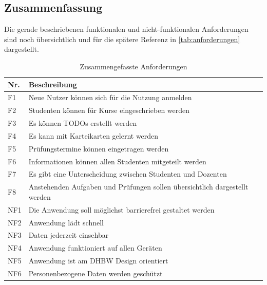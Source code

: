 \subsection{Zusammenfassung}
Die gerade beschriebenen funktionalen und nicht-funktionalen Anforderungen sind noch übersichtlich und für die spätere Referenz in \autoref{tab:anforderungen} dargestellt.


\begin{table}[h]
    \centering
    \begin{tabularx}{.8\textwidth}{l|X}
        Nr.     & Beschreibung                              \\\hline
        F1      & Neue Nutzer können sich für die Nutzung anmelden                    \\
        F2      & Studenten können für Kurse eingeschrieben werden  \\
        F3      & Es können TODOs erstellt werden   \\
        F4      & Es kann mit Karteikarten gelernt werden  \\
        F5      & Prüfungstermine können eingetragen werden  \\
        F6      & Informationen können allen Studenten mitgeteilt werden  \\
        F7      & Es gibt eine Unterscheidung zwischen Studenten und Dozenten  \\
        F8      & Anstehenden Aufgaben und Prüfungen sollen übersichtlich dargestellt werden  \\\hline
        NF1      & Die Anwendung soll möglichst barrierefrei gestaltet werden\\
        NF2     & Anwendung lädt schnell                    \\
        NF3     & Daten jederzeit einsehbar                 \\
        NF4     & Anwendung funktioniert auf allen Geräten  \\
        NF5     & Anwendung ist am DHBW Design orientiert   \\
        NF6     & Personenbezogene Daten werden geschützt  \\
    \end{tabularx}
    \caption{Zusammengefasste Anforderungen}
    \label{tab:anforderungen}
\end{table}




